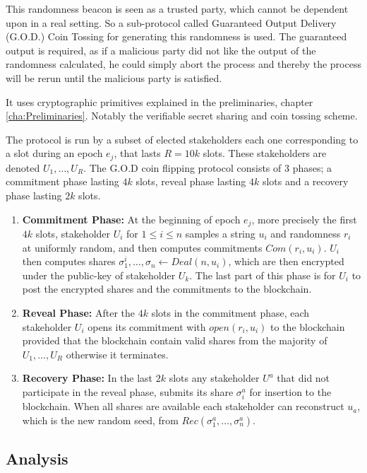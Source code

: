 This randomness beacon is seen as a trusted party, which cannot be dependent upon in a real setting. So a sub-protocol called Guaranteed Output Delivery (G.O.D.) Coin Tossing for generating this randomness is used. The guaranteed output is required, as if a malicious party did not like the output of the randomness calculated, he could simply abort the process and thereby the process will be rerun until the malicious party is satisfied.

It uses cryptographic primitives explained in the preliminaries, chapter \ref{cha:Preliminaries}. Notably the verifiable secret sharing and coin tossing scheme. 

The protocol is run by a subset of elected stakeholders each one corresponding to a slot during an epoch $e_j$, that lasts $R = 10k$ slots. These stakeholders are denoted $U_1, \dots, U_R$. The G.O.D coin flipping protocol consists of 3 phases; a commitment phase lasting $4k$ slots, reveal phase lasting $4k$ slots and a recovery phase lasting $2k$ slots. 


\begin{enumerate}
    \item \textbf{Commitment Phase:} At the beginning of epoch $e_j$, more precisely the first $4k$ slots, stakeholder $U_i$ for $1\leq i \leq n$ samples a string $u_i$ and randomness $r_i$ at uniformly random, and then computes commitments $Com(r_i, u_i)$. $U_i$ then computes shares $\sigma_1^i,\ldots, \sigma_n \xleftarrow{} Deal(n,u_i)$, which are then encrypted under the public-key of stakeholder $U_k$. The last part of this phase is for $U_i$ to post the encrypted shares and the commitments to the blockchain.   
    \item \textbf{Reveal Phase:} After the $4k$ slots in the commitment phase, each stakeholder $U_i$ opens its commitment with $open(r_i, u_i)$ to the blockchain provided that the blockchain contain valid shares from the majority of $U_1,\dots, U_R$ otherwise it terminates.
    \item \textbf{Recovery Phase:} In the last $2k$ slots any stakeholder $U^a$ that did not participate in the reveal phase, submits its share $\sigma^a_i$ for insertion to the blockchain. When all shares are available each stakeholder can reconstruct $u_a$, which is the new random seed, from $Rec(\sigma^a_1, \dots, \sigma^a_n)$.
\end{enumerate}



\subsection{Analysis}
\label{sec:ouro-anal}

